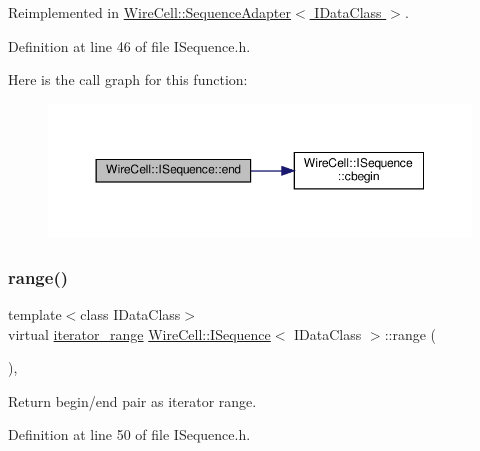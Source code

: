 Reimplemented in \hyperlink{class_wire_cell_1_1_sequence_adapter_a7b3736b3876b4a2091254e42cb5d2900}{Wire\+Cell\+::\+Sequence\+Adapter$<$ I\+Data\+Class $>$}.



Definition at line 46 of file I\+Sequence.\+h.

Here is the call graph for this function\+:
\nopagebreak
\begin{figure}[H]
\begin{center}
\leavevmode
\includegraphics[width=350pt]{class_wire_cell_1_1_i_sequence_a4aeda2d0a7c1ffd3b1a708c7e983487a_cgraph}
\end{center}
\end{figure}
\mbox{\label{class_wire_cell_1_1_i_sequence_a5ea837972a6ba68ef563902edd25a8a4}} 
\subsubsection{\texorpdfstring{range()}{range()}}
{\footnotesize\ttfamily template$<$class I\+Data\+Class$>$ \\
virtual \hyperlink{class_wire_cell_1_1_i_sequence_ac49f0584f3aaafc13a525953ebafad95}{iterator\+\_\+range} \hyperlink{class_wire_cell_1_1_i_sequence}{Wire\+Cell\+::\+I\+Sequence}$<$ I\+Data\+Class $>$\+::range (\begin{DoxyParamCaption}{ }\end{DoxyParamCaption})\hspace{0.3cm}{\ttfamily [inline]}, {\ttfamily [virtual]}}



Return begin/end pair as iterator range. 



Definition at line 50 of file I\+Sequence.\+h.

